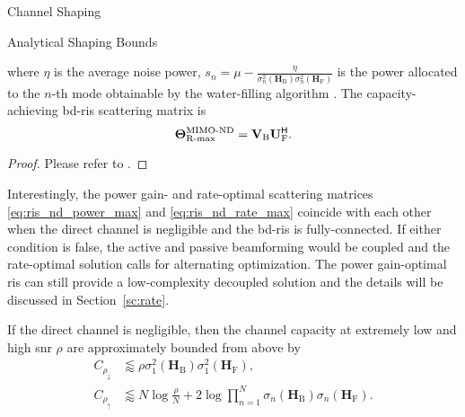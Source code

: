 \documentclass[journal]{IEEEtran}
\begin{document}
\begin{section}{Channel Shaping}
\begin{subsection}{Analytical Shaping Bounds}
\begin{corollary}
\begin{equation}
			\end{equation}
			where $\eta$ is the average noise power, $s_n = \mu - \frac{\eta}{\sigma_n^2(\mathbf{H}_\mathrm{B}) \sigma_n^2(\mathbf{H}_\mathrm{F})}$ is the power allocated to the $n$-th mode obtainable by the water-filling algorithm \cite{Clerckx2013}.
			The capacity-achieving \gls{bd}-\gls{ris} scattering matrix is
			\begin{equation}
				\label{eq:ris_nd_rate_max}
				\mathbf{\Theta}_\textnormal{R-max}^\textnormal{MIMO-ND} = \mathbf{V}_\mathrm{B} \mathbf{U}_\mathrm{F}^\mathsf{H}.
			\end{equation}
		\end{corollary}

		\begin{proof}
			Please refer to \cite[Appendix~A]{Bartoli2023}.
		\end{proof}

		Interestingly, the power gain- and rate-optimal scattering matrices \eqref{eq:ris_nd_power_max} and \eqref{eq:ris_nd_rate_max} coincide with each other when the direct channel is negligible and the \gls{bd}-\gls{ris} is fully-connected.
		If either condition is false, the active and passive beamforming would be coupled and the rate-optimal solution calls for alternating optimization.
		The power gain-optimal \gls{ris} can still provide a low-complexity decoupled solution and the details will be discussed in Section~\ref{sc:rate}.

		\begin{corollary}
			\label{co:nd_capacity_snr_extreme}
			If the direct channel is negligible, then the channel capacity at extremely low and high \gls{snr} $\rho$ are approximately bounded from above by
			\begin{subequations}
				\label{iq:capacity_nd_snr_extreme}
				\begin{align}
					C_{\rho_\downarrow} & \lessapprox \rho \sigma_1^2(\mathbf{H}_\mathrm{B}) \sigma_1^2(\mathbf{H}_\mathrm{F}), \label{iq:capacity_nd_snr_low}                                           \\
					C_{\rho_\uparrow}   & \lessapprox N \log \frac{\rho}{N} + 2 \log \prod_{n=1}^N \sigma_n(\mathbf{H}_\mathrm{B}) \sigma_n(\mathbf{H}_\mathrm{F}). \label{iq:capacity_nd_snr_high}
				\end{align}
			\end{subequations}
		\end{corollary}


\end{subsection}
\end{section}
\end{document}
